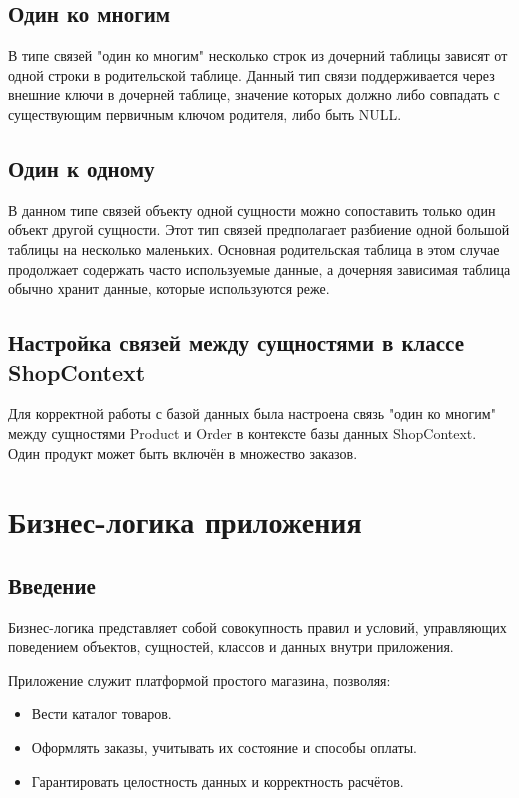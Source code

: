 \documentclass[a4paper,12pt]{report}
\begin{document}
\subsection{Один ко многим}

В типе связей "один ко многим" несколько строк из дочерний таблицы зависят от одной строки в родительской таблице.
Данный тип связи поддерживается через внешние ключи в дочерней таблице, значение которых должно либо совпадать 
с существующим первичным ключом родителя, либо быть NULL.

\subsection{Один к одному}

В данном типе связей объекту одной сущности можно сопоставить только один объект другой сущности.
Этот тип связей предполагает разбиение одной большой таблицы на несколько маленьких. 
Основная родительская таблица в этом случае продолжает содержать часто используемые данные, 
а дочерняя зависимая таблица обычно хранит данные, которые используются реже.

\subsection{Настройка связей между сущностями в классе ShopContext}

Для корректной работы с базой данных была настроена связь "один ко многим" между сущностями Product и Order 
в контексте базы данных ShopContext. Один продукт может быть включён в множество заказов.

\section{Бизнес-логика приложения}

\subsection{Введение}

Бизнес-логика представляет собой совокупность правил и условий, управляющих поведением объектов, сущностей, классов и данных внутри приложения.

Приложение служит платформой простого магазина, позволяя:
\begin{itemize}
    \item
        Вести каталог товаров.
    \item
        Оформлять заказы, учитывать их состояние и способы оплаты.
    \item
        Гарантировать целостность данных и корректность расчётов.
\end{itemize}
\end{document}
